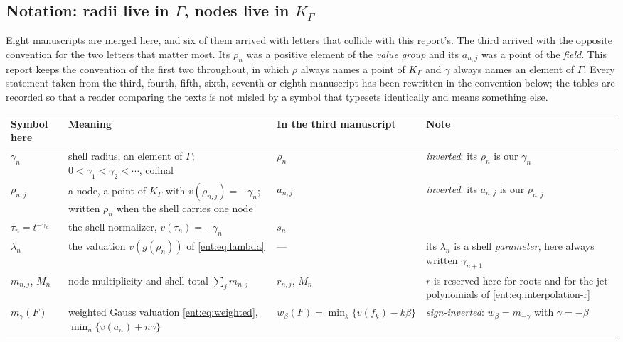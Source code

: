 \documentclass[11pt]{article}
\theoremstyle{plain}
\theoremstyle{plain}
\theoremstyle{plain}
\theoremstyle{definition}
\theoremstyle{definition}
\theoremstyle{definition}
\theoremstyle{definition}
\theoremstyle{remark}
\newcommand{\K}{K_\Gamma}\newcommand{\KD}{K_\Delta}
\begin{document}
\subsection{Notation: radii live in \texorpdfstring{$\Gamma$}{Gamma}, nodes
live in \texorpdfstring{$\K$}{K}}
\label{ent:subsec:notation}
Eight manuscripts are merged here, and six of them arrived with letters
that collide with this report's. The third arrived with the opposite
convention for the two letters that matter most. Its $\rho_n$ was a positive
element of the \emph{value group} and its $a_{n,j}$ was a point of the
\emph{field}. This report keeps the convention of the first two throughout,
in which $\rho$ always names a point of $\K$ and $\gamma$ always names an
element of $\Gamma$. Every statement taken from the third, fourth, fifth,
sixth, seventh or eighth manuscript has been rewritten in the convention below; the tables are
recorded so that a reader comparing the texts is not misled by a symbol that
typesets identically and means something else.

\begin{center}\small
\begin{tabularx}{\textwidth}{@{}P{0.155\textwidth}P{0.255\textwidth}YY@{}}
\toprule
Symbol here & Meaning & In the third manuscript & Note\\\midrule
$\gamma_n$ & shell radius, an element of $\Gamma$; $0<\gamma_1<\gamma_2
<\cdots$, cofinal & $\rho_n$ & \emph{inverted}: its $\rho_n$ is our
$\gamma_n$\\[0.35em]
$\rho_{n,j}$ & a node, a point of $\K$ with $v(\rho_{n,j})=-\gamma_n$;
written $\rho_n$ when the shell carries one node
& $a_{n,j}$ & \emph{inverted}: its $a_{n,j}$ is our $\rho_{n,j}$\\[0.35em]
$\tau_n=t^{-\gamma_n}$ & the shell normalizer, $v(\tau_n)=-\gamma_n$
& $s_n$ & \\[0.35em]
$\lambda_n$ & the valuation $v(g(\rho_n))$ of \eqref{ent:eq:lambda}
& --- & its $\lambda_n$ is a shell \emph{parameter}, here always written
$\gamma_{n+1}$\\[0.35em]
$m_{n,j}$, $M_n$ & node multiplicity and shell total $\sum_jm_{n,j}$
& $r_{n,j}$, $M_n$ & $r$ is reserved here for roots and for the jet
polynomials of \eqref{ent:eq:interpolation-r}\\[0.35em]
$m_\gamma(F)$ & weighted Gauss valuation \eqref{ent:eq:weighted},
$\min_n\{v(a_n)+n\gamma\}$ & $w_\beta(F)=\min_k\{v(f_k)-k\beta\}$
& \emph{sign-inverted}: $w_\beta=m_{-\gamma}$ with $\gamma=-\beta$\\
\bottomrule
\end{tabularx}
\end{center}
\end{document}
